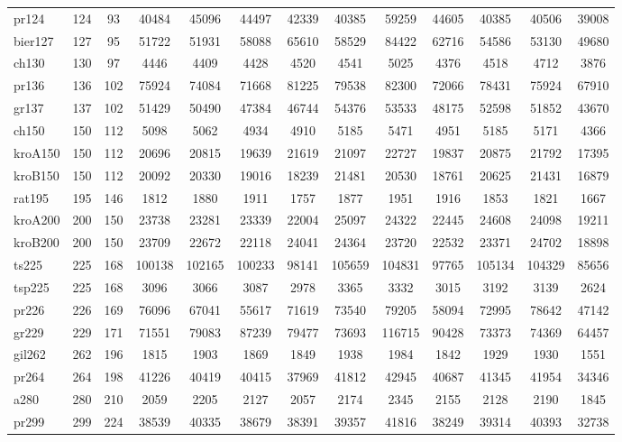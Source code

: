 \documentclass[conference]{IEEEtran}
\begin{document}
\begin{table}[htbp]
{{\begin{tabular}{|l|c|c|c|c|c|c|c|c|c|c|c|c|}
pr124 & 124 & 93 & 40484 & 45096 & 44497 & 42339 & 40385 & 59259 & 44605 & 40385 & 40506 & 39008 \\
bier127 & 127 & 95 & 51722 & 51931 & 58088 & 65610 & 58529 & 84422 & 62716 & 54586 & 53130 & 49680 \\
ch130 & 130 & 97 & 4446 & 4409 & 4428 & 4520 & 4541 & 5025 & 4376 & 4518 & 4712 & 3876 \\
pr136 & 136 & 102 & 75924 & 74084 & 71668 & 81225 & 79538 & 82300 & 72066 & 78431 & 75924 & 67910 \\
gr137 & 137 & 102 & 51429 & 50490 & 47384 & 46744 & 54376 & 53533 & 48175 & 52598 & 51852 & 43670 \\
ch150 & 150 & 112 & 5098 & 5062 & 4934 & 4910 & 5185 & 5471 & 4951 & 5185 & 5171 & 4366 \\
kroA150 & 150 & 112 & 20696 & 20815 & 19639 & 21619 & 21097 & 22727 & 19837 & 20875 & 21792 & 17395 \\
kroB150 & 150 & 112 & 20092 & 20330 & 19016 & 18239 & 21481 & 20530 & 18761 & 20625 & 21431 & 16879 \\
rat195 & 195 & 146 & 1812 & 1880 & 1911 & 1757 & 1877 & 1951 & 1916 & 1853 & 1821 & 1667 \\
kroA200 & 200 & 150 & 23738 & 23281 & 23339 & 22004 & 25097 & 24322 & 22445 & 24608 & 24098 & 19211 \\
kroB200 & 200 & 150 & 23709 & 22672 & 22118 & 24041 & 24364 & 23720 & 22532 & 23371 & 24702 & 18898 \\
ts225 & 225 & 168 & 100138 & 102165 & 100233 & 98141 & 105659 & 104831 & 97765 & 105134 & 104329 & 85656 \\
tsp225 & 225 & 168 & 3096 & 3066 & 3087 & 2978 & 3365 & 3332 & 3015 & 3192 & 3139 & 2624 \\
pr226 & 226 & 169 & 76096 & 67041 & 55617 & 71619 & 73540 & 79205 & 58094 & 72995 & 78642 & 47142 \\
gr229 & 229 & 171 & 71551 & 79083 & 87239 & 79477 & 73693 & 116715 & 90428 & 73373 & 74369 & 64457 \\
gil262 & 262 & 196 & 1815 & 1903 & 1869 & 1849 & 1938 & 1984 & 1842 & 1929 & 1930 & 1551 \\
pr264 & 264 & 198 & 41226 & 40419 & 40415 & 37969 & 41812 & 42945 & 40687 & 41345 & 41954 & 34346 \\
a280 & 280 & 210 & 2059 & 2205 & 2127 & 2057 & 2174 & 2345 & 2155 & 2128 & 2190 & 1845 \\
pr299 & 299 & 224 & 38539 & 40335 & 38679 & 38391 & 39357 & 41816 & 38249 & 39314 & 40393 & 32738 \\

\end{tabular}}}
\end{table}
\end{document}
